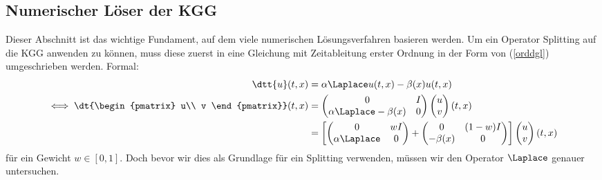 \subsection{Numerischer Löser der KGG}
Dieser Abschnitt ist das wichtige Fundament, auf dem viele numerischen Lösungsverfahren basieren werden. Um ein Operator Splitting auf die KGG anwenden zu können, muss diese zuerst in eine Gleichung mit Zeitableitung erster Ordnung in der Form von (\ref{orddgl}) umgeschrieben werden. Formal:
\begin{align}
\dtt{u}(t,x)&=\alpha \Laplace u(t,x) - \beta(x)u(t,x)\nonumber\\
\iff
\dt{\begin{pmatrix}
u\\
v
\end{pmatrix}}(t,x)&=
\begin{pmatrix}
0 & I\\
\alpha \Laplace - \beta(x) & 0
\end{pmatrix}
\begin{pmatrix}u\\v\end{pmatrix}(t,x)\nonumber\\
\label{eqn:formalsplit_kgg}
&=\left[\begin{pmatrix} 0 & wI\\ \alpha \Laplace & 0\end{pmatrix} 
+ \begin{pmatrix} 0 & (1-w)I\\ -\beta(x) & 0\end{pmatrix}\right]
\begin{pmatrix}u\\v\end{pmatrix}(t,x)
\end{align}
für ein Gewicht $w\in [0,1]$. Doch bevor wir dies als Grundlage für ein Splitting verwenden, müssen wir den Operator $\Laplace$ genauer untersuchen.

